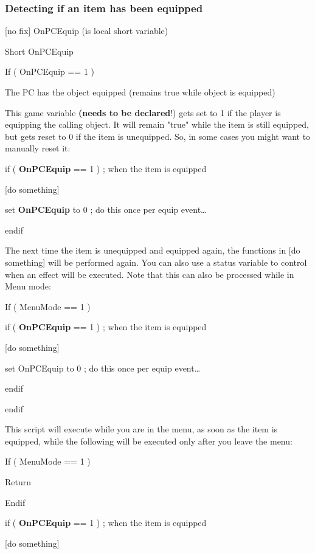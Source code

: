 \documentclass[
]{article}
\begin{document}


\hypertarget{detecting-if-an-item-has-been-equipped}{%
\subsubsection{Detecting if an item has been
equipped}\label{detecting-if-an-item-has-been-equipped}}

{[}no fix{]} OnPCEquip (is local short variable)

Short OnPCEquip

If ( OnPCEquip == 1 )

The PC has the object equipped (remains true while object is equipped)

This game variable \textbf{(needs to be declared}!) gets set to 1 if the
player is equipping the calling object. It will remain "true" while the
item is still equipped, but gets reset to 0 if the item is unequipped.
So, in some cases you might want to manually reset it:

if ( \textbf{OnPCEquip} == 1 ) ; when the item is equipped

{[}do something{]}

set \textbf{OnPCEquip} to 0 ; do this once per equip event\ldots{}

endif

The next time the item is unequipped and equipped again, the functions
in {[}do something{]} will be performed again. You can also use a status
variable to control when an effect will be executed. Note that this can
also be processed while in Menu mode:

If ( MenuMode == 1 )

if ( \textbf{OnPCEquip} == 1 ) ; when the item is equipped

{[}do something{]}

set OnPCEquip to 0 ; do this once per equip event\ldots{}

endif

endif

This script will execute while you are in the menu, as soon as the item
is equipped, while the following will be executed only after you leave
the menu:

If ( MenuMode == 1 )

Return

Endif

if ( \textbf{OnPCEquip} == 1 ) ; when the item is equipped

{[}do something{]}
\end{document}
